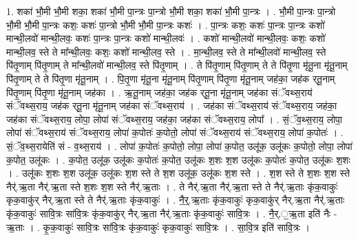 \documentclass[17pt]{extarticle}
\begin{document}
1. शका॑ भौ॒मी भौ॒मी शका॒ शका॑ भौ॒मी पा॒न्त्रः पा॒न्त्रो भौ॒मी शका॒ शका॑ भौ॒मी पा॒न्त्रः । . भौ॒मी पा॒न्त्रः पा॒न्त्रो भौ॒मी भौ॒मी पा॒न्त्रः कशः॒ कशः॑ पा॒न्त्रो भौ॒मी भौ॒मी पा॒न्त्रः कशः॑ । . पा॒न्त्रः कशः॒ कशः॑ पा॒न्त्रः पा॒न्त्रः कशो॑ मान्थी॒लवो॑ मान्थी॒लवः॒ कशः॑ पा॒न्त्रः पा॒न्त्रः कशो॑ मान्थी॒लवः॑ । . कशो॑ मान्थी॒लवो॑ मान्थी॒लवः॒ कशः॒ कशो॑ मान्थी॒लव॒ स्ते ते मा᳚न्थी॒लवः॒ कशः॒ कशो॑ मान्थी॒लव॒ स्ते । . मा॒न्थी॒लव॒ स्ते ते मा᳚न्थी॒लवो॑ मान्थी॒लव॒ स्ते पि॑तृ॒णाम् पि॑तृ॒णाम् ते मा᳚न्थी॒लवो॑ मान्थी॒लव॒ स्ते पि॑तृ॒णाम् । . ते पि॑तृ॒णाम् पि॑तृ॒णाम् ते ते पि॑तृ॒णा मृ॑तू॒ना मृ॑तू॒नाम् पि॑तृ॒णाम् ते ते पि॑तृ॒णा मृ॑तू॒नाम् । . पि॒तृ॒णा मृ॑तू॒ना मृ॑तू॒नाम् पि॑तृ॒णाम् पि॑तृ॒णा मृ॑तू॒नाम् जह॑का॒ जह॑क र्‌तू॒नाम् पि॑तृ॒णाम् पि॑तृ॒णा मृ॑तू॒नाम् जह॑का । . ऋ॒तू॒नाम् जह॑का॒ जह॑क र्‌तू॒ना मृ॑तू॒नाम् जह॑का संॅवथ्स॒राय॑ संॅवथ्स॒राय॒ जह॑क र्‌तू॒ना मृ॑तू॒नाम् जह॑का संॅवथ्स॒राय॑ । . जह॑का संॅवथ्स॒राय॑ संॅवथ्स॒राय॒ जह॑का॒ जह॑का संॅवथ्स॒राय॒ लोपा॒ लोपा॑ संॅवथ्स॒राय॒ जह॑का॒ जह॑का संॅवथ्स॒राय॒ लोपा᳚ । . सं॒ॅव॒थ्स॒राय॒ लोपा॒ लोपा॑ संॅवथ्स॒राय॑ संॅवथ्स॒राय॒ लोपा॑ क॒पोतः॑ क॒पोतो॒ लोपा॑ संॅवथ्स॒राय॑ संॅवथ्स॒राय॒ लोपा॑ क॒पोतः॑ । . सं॒ॅव॒थ्स॒रायेति॑ सं - व॒थ्स॒राय॑ । . लोपा॑ क॒पोतः॑ क॒पोतो॒ लोपा॒ लोपा॑ क॒पोत॒ उलू॑क॒ उलू॑कः क॒पोतो॒ लोपा॒ लोपा॑ क॒पोत॒ उलू॑कः । . क॒पोत॒ उलू॑क॒ उलू॑कः क॒पोतः॑ क॒पोत॒ उलू॑कः श॒शः श॒श उलू॑कः क॒पोतः॑ क॒पोत॒ उलू॑कः श॒शः । . उलू॑कः श॒शः श॒श उलू॑क॒ उलू॑कः श॒श स्ते ते श॒श उलू॑क॒ उलू॑कः श॒श स्ते । . श॒श स्ते ते श॒शः श॒श स्ते नैर्॑.ऋ॒ता नैर्॑.ऋ॒ता स्ते श॒शः श॒श स्ते नैर्॑.ऋ॒ताः । . ते नैर्॑.ऋ॒ता नैर्॑.ऋ॒ता स्ते ते नैर्॑.ऋ॒ताः कृ॑क॒वाकुः॑ कृक॒वाकु॑र् नैर्.ऋ॒ता स्ते ते नैर्॑.ऋ॒ताः कृ॑क॒वाकुः॑ । . नै॒र्॒.ऋ॒ताः कृ॑क॒वाकुः॑ कृक॒वाकु॑र् नैर्.ऋ॒ता नैर्॑.ऋ॒ताः कृ॑क॒वाकुः॑ सावि॒त्रः सा॑वि॒त्रः कृ॑क॒वाकु॑र् नैर्.ऋ॒ता नैर्॑.ऋ॒ताः कृ॑क॒वाकुः॑ सावि॒त्रः । . नै॒र्.॒ऋ॒ता इति॑ नैः - ऋ॒ताः । . कृ॒क॒वाकुः॑ सावि॒त्रः सा॑वि॒त्रः कृ॑क॒वाकुः॑ कृक॒वाकुः॑ सावि॒त्रः । . सा॒वि॒त्र इति॑ सावि॒त्रः । \newline
\pagebreak
{}
\end{document}
